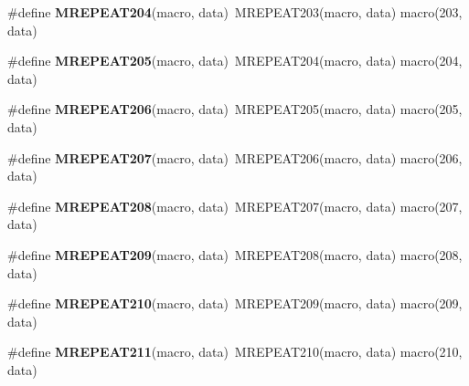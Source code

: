 \begin{DoxyCompactItemize}
\item 
\hypertarget{group__group__sam0__utils__mrepeat_ga0e339097dee89fd4eaf9885f32db1c16}{}\#define {\bfseries M\+R\+E\+P\+E\+A\+T204}(macro,  data)~M\+R\+E\+P\+E\+A\+T203(macro, data)   macro(203, data)\label{group__group__sam0__utils__mrepeat_ga0e339097dee89fd4eaf9885f32db1c16}

\item 
\hypertarget{group__group__sam0__utils__mrepeat_gae672303fe7f3ba300d061715db22723f}{}\#define {\bfseries M\+R\+E\+P\+E\+A\+T205}(macro,  data)~M\+R\+E\+P\+E\+A\+T204(macro, data)   macro(204, data)\label{group__group__sam0__utils__mrepeat_gae672303fe7f3ba300d061715db22723f}

\item 
\hypertarget{group__group__sam0__utils__mrepeat_ga899fa83ef3f1e32c26c7decdb29e5747}{}\#define {\bfseries M\+R\+E\+P\+E\+A\+T206}(macro,  data)~M\+R\+E\+P\+E\+A\+T205(macro, data)   macro(205, data)\label{group__group__sam0__utils__mrepeat_ga899fa83ef3f1e32c26c7decdb29e5747}

\item 
\hypertarget{group__group__sam0__utils__mrepeat_ga3f4ed7437c340ec027580d80fdbfc353}{}\#define {\bfseries M\+R\+E\+P\+E\+A\+T207}(macro,  data)~M\+R\+E\+P\+E\+A\+T206(macro, data)   macro(206, data)\label{group__group__sam0__utils__mrepeat_ga3f4ed7437c340ec027580d80fdbfc353}

\item 
\hypertarget{group__group__sam0__utils__mrepeat_ga376e9d40a620958fa73305665ad13e5d}{}\#define {\bfseries M\+R\+E\+P\+E\+A\+T208}(macro,  data)~M\+R\+E\+P\+E\+A\+T207(macro, data)   macro(207, data)\label{group__group__sam0__utils__mrepeat_ga376e9d40a620958fa73305665ad13e5d}

\item 
\hypertarget{group__group__sam0__utils__mrepeat_ga6febba153ad3a3ea0ddd84b95ddded40}{}\#define {\bfseries M\+R\+E\+P\+E\+A\+T209}(macro,  data)~M\+R\+E\+P\+E\+A\+T208(macro, data)   macro(208, data)\label{group__group__sam0__utils__mrepeat_ga6febba153ad3a3ea0ddd84b95ddded40}

\item 
\hypertarget{group__group__sam0__utils__mrepeat_ga888280894db1adc77f3524c72d226bc3}{}\#define {\bfseries M\+R\+E\+P\+E\+A\+T210}(macro,  data)~M\+R\+E\+P\+E\+A\+T209(macro, data)   macro(209, data)\label{group__group__sam0__utils__mrepeat_ga888280894db1adc77f3524c72d226bc3}

\item 
\hypertarget{group__group__sam0__utils__mrepeat_ga9b4e3f709d79be3abf426a6f35373a9f}{}\#define {\bfseries M\+R\+E\+P\+E\+A\+T211}(macro,  data)~M\+R\+E\+P\+E\+A\+T210(macro, data)   macro(210, data)\label{group__group__sam0__utils__mrepeat_ga9b4e3f709d79be3abf426a6f35373a9f}


\end{DoxyCompactItemize}
